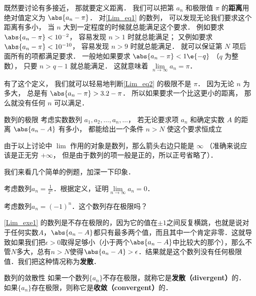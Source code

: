 既然要讨论有多接近， 那就要定义距离． 我们可以把第 $a_n$ 和极限值 $\pi$ 的\textbf{距离}用绝对值定义为 $\abs{a_n - \pi}$． 对\autoref{Lim_eq1} 的数列， 可以发现无论我们要求这个距离有多小， 当 $n$ 大到一定程度的时候就总能满足这个要求． 例如要求 $\abs{a_n - \pi} < 10^{-2}$， 容易发现 $n > 1$ 时就总能满足； 又例如要求 $\abs{a_n - \pi} < 10^{-10}$， 容易发现 $n > 9$ 时就总能满足． 就可以保证第 $N$ 项后面所有的项都满足要求． 一般地如果要求 $\abs{a_n - \pi} < 1\e{-q}$ （$q$ 为整数）， 只要 $n > q-1$ 就总能满足． 这就意味着 $\lim\limits_{n \to \infty } a_n = \pi$．

有了这个定义， 我们就可以轻易地判断\autoref{Lim_eq2} 的极限不是 $\pi$． 因为无论 $n$ 为多大， 总是有 $\abs{a_n - \pi} > 3.2 - \pi$． 所以如果要求一个比这更小的距离， 那么就没有任何 $n$ 可以满足．

\begin{definition}{数列的极限}\label{Lim_def2}
考虑实数数列 $a_1, a_2, \dots, a_n, \dots$， 若无论要求项 $a_n$ 和确定实数 $A$ 的距离 $\abs{a_n - A}$ 有多小， 都能给出一个条件 $n > N$ 使这个要求恒成立
\end{definition}



由于以上讨论中 $\lim$ 作用的对象是数列，那么箭头右边只能是 $\infty$ （准确来说应该是正无穷 $+\infty$， 但是由于数列的项一般是正的，所以正号省略了）．



我们来看几个简单的例题，加深一下印象．

\begin{exercise}{}
考虑数列$a_n=\frac{1}{2^n}$．根据定义，证明$\lim\limits_{n\to\infty}a_n=0$．
\end{exercise}

\begin{exercise}{}\label{Lim_exe1}
考虑数列$a_n=(-1)^n$．这个数列存在极限吗？
\end{exercise}

\autoref{Lim_exe1} 的数列是不存在极限的，因为它的值在$\pm 1$之间反复横跳，也就是说对于任何实数$A$，$\abs{a_n-A}$都只有最多两个值，而且其中一个肯定非零．这就导致如果我们把$\epsilon>0$取得足够小（小于两个$\abs{a_n-A}$中比较大的那个），那么不管$N$多大，总有$n>N$使得$\abs{a_n-A}>\epsilon$．结果就是这个数列没有任何极限值．我们把这种情况称为\textbf{发散}．

\begin{definition}{数列的敛散性}\label{Lim_def4}
如果一个数列$\{a_n\}$不存在极限，就称它是\textbf{发散（divergent）}的．如果$\{a_n\}$存在极限，则称它是\textbf{收敛（convergent）}的．
\end{definition}

